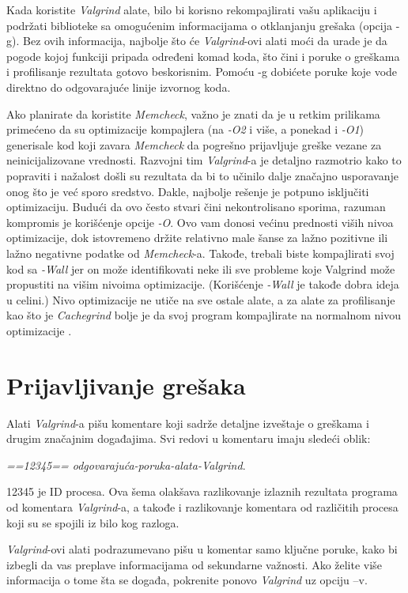 \documentclass[12pt,oneside]{memoir}
\theoremstyle{plain}
\theoremstyle{definition}
\begin{document}
Kada koristite \textit{Valgrind} alate, bilo bi korisno rekompajlirati vašu aplikaciju i podržati biblioteke sa omogućenim informacijama o otklanjanju grešaka (opcija -g). Bez ovih informacija, najbolje što će \textit{Valgrind}-ovi alati  moći da urade je da pogode kojoj funkciji pripada određeni komad koda, što čini i poruke o greškama i profilisanje rezultata gotovo beskorisnim. Pomoću -g dobićete poruke koje vode direktno do odgovarajuće linije izvornog koda.

Ako planirate da koristite \textit{Memcheck}, važno je znati da je u retkim prilikama primećeno da su optimizacije kompajlera (na \textit{-O2} i više, a ponekad i \textit{-O1}) generisale kod koji zavara \textit{Memcheck} da pogrešno prijavljuje greške vezane za neinicijalizovane vrednosti. Razvojni tim \textit{Valgrind}-a je detaljno razmotrio kako to popraviti i nažalost došli su rezultata  da bi to učinilo dalje značajno usporavanje onog što je već sporo sredstvo. Dakle, najbolje rešenje je potpuno isključiti optimizaciju. Budući da ovo često stvari čini nekontrolisano sporima, razuman kompromis je korišćenje opcije \textit{-O}. Ovo vam donosi većinu prednosti viših nivoa optimizacije, dok istovremeno držite relativno male šanse za lažno pozitivne ili lažno negativne podatke od \textit{Memcheck}-a. Takođe, trebali biste kompajlirati svoj kod sa \textit{-Wall} jer on može identifikovati neke ili sve probleme koje Valgrind može propustiti na višim nivoima optimizacije. (Korišćenje \textit{-Wall} je takođe dobra ideja u celini.) Nivo optimizacije ne utiče na sve ostale alate, a za alate za profilisanje kao što je \textit{Cachegrind} bolje je da svoj program kompajlirate na normalnom nivou optimizacije \cite{ValgrindCore}. 

\section{Prijavljivanje grešaka}
Alati \textit{Valgrind}-a pišu komentare koji sadrže detaljne izveštaje o greškama i drugim značajnim događajima. Svi redovi u komentaru imaju sledeći oblik:
\begin{center}
\textit{==12345== odgovarajuća-poruka-alata-Valgrind}.
\end{center}
12345 je ID procesa. Ova šema olakšava razlikovanje izlaznih rezultata programa od komentara \textit{Valgrind}-a, a takođe i razlikovanje komentara od različitih procesa koji su se spojili iz bilo kog razloga.

\textit{Valgrind}-ovi alati podrazumevano pišu u komentar samo ključne poruke, kako bi izbegli da vas preplave informacijama od sekundarne važnosti. Ako želite više informacija o tome šta se događa, pokrenite ponovo \textit{Valgrind} uz opciju –v.
\end{document}
